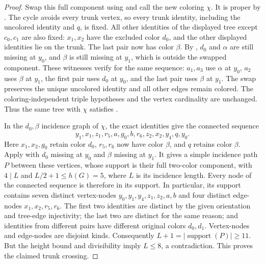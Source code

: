 \begin{proof}
Swap this full component using  and call
the new coloring $\chi$.  It is proper by
.  The cycle avoids every trunk
vertex, so every trunk identity, including the uncolored identity and
$q$, is fixed.  All other identities of the displayed tree except
$c_0,c_1$ are also fixed: $x_1,x_2$ have the excluded color $d_0$,
and the other displayed identities lie on the trunk.  The last pair now
has color $\beta$.  By ,
$d_0$ and $\alpha$ are still missing at $y_0$, and $\beta$ is still
missing at $y_1$, which is outside the swapped component.
These witnesses verify  for the same sequence:
$a_1,a_3$ use $\alpha$ at $y_0$, $a_2$ uses $\beta$ at $y_1$,
the first pair uses $d_0$ at $y_0$, and the last pair uses $\beta$ at
$y_1$.  The swap preserves the unique uncolored identity and all other
edges remain colored.  The coloring-independent triple hypotheses and
the vertex cardinality are unchanged.  Thus the same tree with $\chi$
satisfies .

In the $d_0,\beta$ incidence graph of $\chi$, the exact identities give
the connected sequence
\[
 y_1,x_1,z_1,r_5,a,g_0,b,r_6,z_2,x_2,y_4,q,y_0.
\]
Here $x_1,x_2,g_0$ retain color $d_0$, $r_5,r_6$ now have color
$\beta$, and $q$ retains color $\beta$.  Apply
 with $d_0$ missing at $y_0$
and $\beta$ missing at $y_1$.  It gives a simple incidence path $P$
between these vertices, whose support is their full two-color component,
with $4\mid L$ and $L/2+1\leq h(G)=5$, where $L$ is its incidence
length.  Every node of the connected sequence is therefore in its
support.  In particular, its support contains seven distinct vertex-nodes
$y_0,y_1,y_4,z_1,z_2,a,b$ and four distinct edge-nodes
$x_1,x_2,r_5,r_6$.  The first two identities are distinct by the given
orientation and tree-edge injectivity; the last two are distinct for the
same reason; and identities from different pairs have different original
colors $d_0,d_1$.  Vertex-nodes and edge-nodes are disjoint kinds.
Consequently $L+1=|\operatorname{support}(P)|\geq11$.  But the height
bound and divisibility imply $L\leq8$, a contradiction.  This proves
the claimed trunk crossing.


\end{proof}
